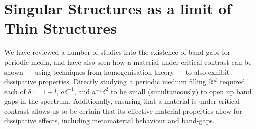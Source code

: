 \section{Singular Structures as a limit of Thin Structures} \label{sec:ConvToSS}

We have reviewed a number of studies into the existence of band-gaps for periodic media, and have also seen how a material under critical contrast can be shown --- using techniques from homogenisation theory --- to also exhibit dissipative properties.
Directly studying a periodic medium filling $\mathbb{R}^d$ required each of $\delta:=1-l$, $a\delta^{-1}$, and $a^{-1}\delta^2$ to be small (simultaneously) to open up band gaps in the spectrum.
Additionally, ensuring that a material is under critical contrast allows us to be certain that its effective material properties allow for dissipative effects, including metamaterial behaviour and band-gaps.

